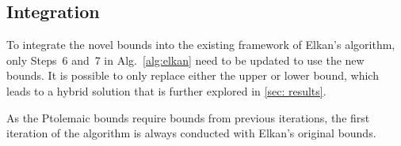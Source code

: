 \subsection{Integration}
To integrate the novel bounds into the existing framework of Elkan's algorithm,
only Steps~6 and~7 in Alg.~\autoref{alg:elkan} need to be updated to use the new bounds.
It is possible to only replace either the upper or lower bound, which leads to a hybrid solution that is further explored in \autoref{sec: results}.

As the Ptolemaic bounds require bounds from previous iterations, the first iteration of the algorithm is always conducted with Elkan's original bounds.






